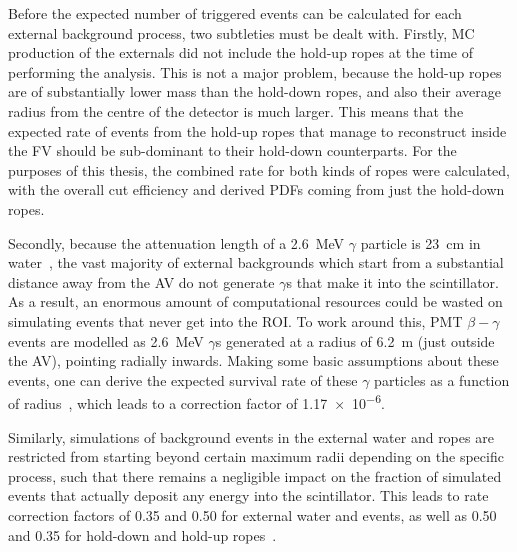 Before the expected number of triggered events can be calculated for each external background process, two subtleties must be dealt with. Firstly, MC production of the externals did not include the hold-up ropes at the time of performing the analysis. This is not a major problem, because the hold-up ropes are of substantially lower mass than the hold-down ropes, and also their average radius from the centre of the detector is much larger. This means that the expected rate of events from the hold-up ropes that manage to reconstruct inside the FV should be sub-dominant to their hold-down counterparts. For the purposes of this thesis, the combined rate for both kinds of ropes were calculated, with the overall cut efficiency and derived PDFs coming from just the hold-down ropes.

Secondly, because the attenuation length of a \SI{2.6}{\MeV} $\gamma$ particle is \SI{23}{\cm} in water~\cite{bergerXCOMPhotonCross2009,heintzelmanSurvivalRadiiPSUP2012}, %
the vast majority of external backgrounds which start from a substantial distance away from the AV do not generate $\gamma$s that make it into the scintillator. As a result, an enormous amount of computational resources could be wasted on simulating events that never get into the ROI. To work around this, PMT $\beta-\gamma$ events are modelled as \SI{2.6}{\MeV} $\gamma$s generated at a radius of \SI{6.2}{\m} (just outside the AV), pointing radially inwards. Making some basic assumptions about these events, one can derive the expected survival rate of these $\gamma$ particles as a function of radius~\cite{heintzelmanSurvivalRadiiPSUP2012,heintzelmanAngularDistributionSurviving2013}, %
which leads to a correction factor of \num{1.17e-6}.

Similarly, simulations of background events in the external water and ropes are restricted from starting beyond certain maximum radii depending on the specific process, such that there remains a negligible impact on the fraction of simulated events that actually deposit any energy into the scintillator. This leads to rate correction factors of 0.35 and 0.50 for external water  and  events, as well as 0.50 and 0.35 for hold-down and hold-up ropes~\cite{inacioUsingSmallerShell2019}. %


